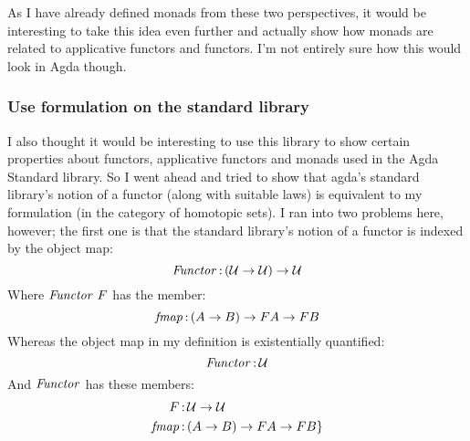 As I have already defined monads from these two perspectives, it would be
interesting to take this idea even further and actually show how monads are
related to applicative functors and functors. I'm not entirely sure how this
would look in Agda though.

\subsubsection{Use formulation on the standard library}
I also thought it would be interesting to use this library to show certain
properties about functors, applicative functors and monads used in the Agda
Standard library. So I went ahead and tried to show that agda's standard
library's notion of a functor (along with suitable laws) is equivalent to my
formulation (in the category of homotopic sets). I ran into two problems here,
however; the first one is that the standard library's notion of a functor is
indexed by the object map:
%
$$
\mathit{Functor} \,\mathord{:}\, (\mathcal{U} \to \mathcal{U}) \to \mathcal{U}
$$
%
Where $\mathit{Functor}\ F$ has the member:
%
$$
\mathit{fmap} \,\mathord{:}\, (A \to B) \to F A \to F B
$$
%
Whereas the object map in my definition is existentially quantified:
%
$$
\mathit{Functor} \,\mathord{:}\, \mathcal{U}
$$
%
And $\mathit{Functor}$ has these members:
\begin{align*}
F     & \,\mathord{:}\, \mathcal{U} \to \mathcal{U} \\
\mathit{fmap} & \,\mathord{:}\, (A \to B) \to F A \to F B\}
\end{align*}
%
